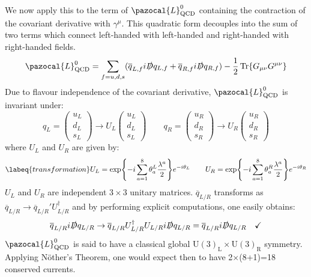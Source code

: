 \documentclass[../main.tex]{subfiles}
\begin{document}
We now apply this to the term of $\pazocal{L}_{\text{QCD}}^0$ containing the contraction of the covariant derivative with $\gamma^\mu$. This quadratic form decouples into the sum of two terms which connect left-handed with left-handed and right-handed with right-handed fields.
\[
\pazocal{L}_{\text{QCD}}^0=\sum_{f=u,d,s}(\overline{q}_{L,f}i\slashed{D}q_{L,f}+\overline{q}_{R,f}i\slashed{D}q_{R,f})-\frac{1}{2}\Tr{G_{\mu\nu}G^{\mu\nu}}
\]
Due to flavour independence of the covariant derivative, $\pazocal{L}_{\text{QCD}}^0$ is invariant under:
\[
q_{L}=\left(\begin{array}{c}
    u_{L}\\
    d_{L}\\
    s_{L}
\end{array}\right)\to U_L\left(\begin{array}{c}
    u_{L}\\
    d_{L}\\
    s_{L}
\end{array}\right)
\qquad
q_{R}=\left(\begin{array}{c}
    u_{R}\\
    d_{R}\\
    s_{R}
\end{array}\right)\to U_R\left(\begin{array}{c}
    u_{R}\\
    d_{R}\\
    s_{R}
\end{array}\right)
\]
where $U_{L}$ and $U_R$ are given by:
\begin{equation}
\labeq{transformation}
U_{L}=\exp{-i\sum_{a=1}^8\theta_a^{L}\frac{\lambda^a}{2}}e^{-i\theta_{L}}
\qquad
U_{R}=\exp{-i\sum_{a=1}^8\theta_a^{R}\frac{\lambda^a}{2}}e^{-i\theta_{R}}
\end{equation}
$U_L$ and $U_R$ are independent $3\times3$ unitary matrices. $\overline{q}_{L/R}$ transforms as $\overline{q}_{L/R}\to\overline{q}_{L/R}'U_{L/R}^\dagger$ and by performing explicit computations, one easily obtains:
\[
\overline{q}_{L/R}i\slashed{D}q_{L/R}\to\overline{q}_{L/R}U_{L/R}^\dagger U_{L/R}i\slashed{D}q_{L/R}=\overline{q}_{L/R}i\slashed{D}q_{L/R} \quad \checkmark
\]
$\pazocal{L}_{\text{QCD}}^0$ is said to have a classical global U$(3)_{\text{L}}\times$U$(3)_{\text{R}}$ symmetry. Applying N\"other's Theorem, one would expect then to have 2$\times$(8+1)=18 conserved currents.
\end{document}
